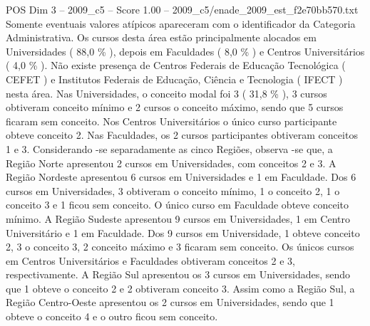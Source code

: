 \begin{textsample}{POS Dim 3 – 2009\_c5 – Score 1.00 – 2009\_c5/enade\_2009\_est\_f2e70bb570.txt}
Somente eventuais valores atípicos apareceram com o identificador da Categoria Administrativa.
Os cursos desta área estão principalmente alocados em Universidades ( 88,0 \% ), depois em Faculdades ( 8,0 \% ) e Centros Universitários ( 4,0 \% ).
Não existe presença de Centros Federais de Educação Tecnológica ( CEFET ) e Institutos Federais de Educação, Ciência e Tecnologia ( IFECT ) nesta área.
Nas Universidades, o conceito modal foi 3 ( 31,8 \% ), 3 cursos obtiveram conceito mínimo e 2 cursos o conceito máximo, sendo que 5 cursos ficaram sem conceito.
Nos Centros Universitários o único curso participante obteve conceito 2.
Nas Faculdades, os 2 cursos participantes obtiveram conceitos 1 e 3.
Considerando -se separadamente as cinco Regiões, observa -se que, a Região Norte apresentou 2 cursos em Universidades, com conceitos 2 e 3.
A Região Nordeste apresentou 6 cursos em Universidades e 1 em Faculdade.
Dos 6 cursos em Universidades, 3 obtiveram o conceito mínimo, 1 o conceito 2, 1 o conceito 3 e 1 ficou sem conceito.
O único curso em Faculdade obteve conceito mínimo.
A Região Sudeste apresentou 9 cursos em Universidades, 1 em Centro Universitário e 1 em Faculdade.
Dos 9 cursos em Universidade, 1 obteve conceito 2, 3 o conceito 3, 2 conceito máximo e 3 ficaram sem conceito.
Os únicos cursos em Centros Universitários e Faculdades obtiveram conceitos 2 e 3, respectivamente.
A Região Sul apresentou os 3 cursos em Universidades, sendo que 1 obteve o conceito 2 e 2 obtiveram conceito 3.
Assim como a Região Sul, a Região Centro-Oeste apresentou os 2 cursos em Universidades, sendo que 1 obteve o conceito 4 e o outro ficou sem conceito.

\end{textsample}

